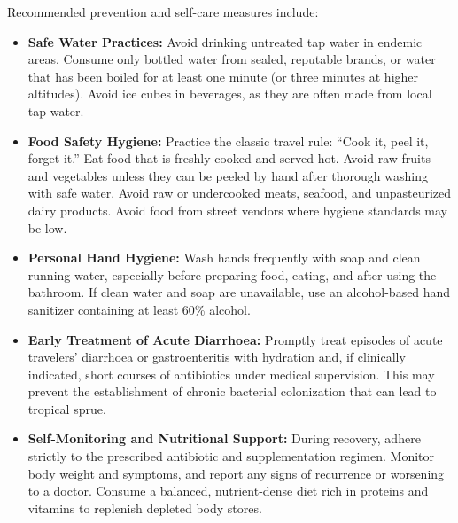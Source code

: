 Recommended prevention and self-care measures include:
\begin{itemize}
    \item \textbf{Safe Water Practices:} Avoid drinking untreated tap water in endemic areas. Consume only bottled water from sealed, reputable brands, or water that has been boiled for at least one minute (or three minutes at higher altitudes). Avoid ice cubes in beverages, as they are often made from local tap water.
    \item \textbf{Food Safety Hygiene:} Practice the classic travel rule: ``Cook it, peel it, forget it.'' Eat food that is freshly cooked and served hot. Avoid raw fruits and vegetables unless they can be peeled by hand after thorough washing with safe water. Avoid raw or undercooked meats, seafood, and unpasteurized dairy products. Avoid food from street vendors where hygiene standards may be low.
    \item \textbf{Personal Hand Hygiene:} Wash hands frequently with soap and clean running water, especially before preparing food, eating, and after using the bathroom. If clean water and soap are unavailable, use an alcohol-based hand sanitizer containing at least 60\% alcohol.
    \item \textbf{Early Treatment of Acute Diarrhoea:} Promptly treat episodes of acute travelers' diarrhoea or gastroenteritis with hydration and, if clinically indicated, short courses of antibiotics under medical supervision. This may prevent the establishment of chronic bacterial colonization that can lead to tropical sprue.
    \item \textbf{Self-Monitoring and Nutritional Support:} During recovery, adhere strictly to the prescribed antibiotic and supplementation regimen. Monitor body weight and symptoms, and report any signs of recurrence or worsening to a doctor. Consume a balanced, nutrient-dense diet rich in proteins and vitamins to replenish depleted body stores.
\end{itemize}

